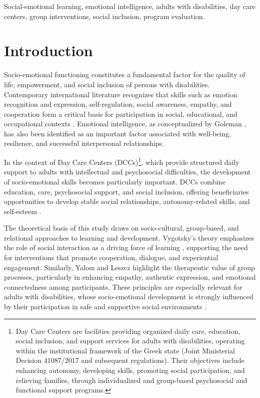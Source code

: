 \documentclass[journal]{IEEEtran}
\begin{document}
\begin{IEEEkeywords}
Social-emotional learning, emotional intelligence, adults with disabilities, day care centers, group interventions, social inclusion, program evaluation.
\end{IEEEkeywords}

\section{Introduction}

Socio-emotional functioning constitutes a fundamental factor for the quality of life, empowerment, and social inclusion of persons with disabilities. Contemporary international literature recognizes that skills such as emotion recognition and expression, self-regulation, social awareness, empathy, and cooperation form a critical basis for participation in social, educational, and occupational contexts \cite{casel2020,weissberg2015}. Emotional intelligence, as conceptualized by Goleman \cite{goleman1995}, has also been identified as an important factor associated with well-being, resilience, and successful interpersonal relationships.

In the context of Day Care Centers (DCCs)\footnote{Day Care Centers are facilities providing organized daily care, education, social inclusion, and support services for adults with disabilities, operating within the institutional framework of the Greek state (Joint Ministerial Decision 41087/2017 and subsequent regulations). Their objectives include enhancing autonomy, developing skills, promoting social participation, and relieving families, through individualized and group-based psychosocial and functional support programs.}, which provide structured daily support to adults with intellectual and psychosocial difficulties, the development of socio-emotional skills becomes particularly important. DCCs combine education, care, psychosocial support, and social inclusion, offering beneficiaries opportunities to develop stable social relationships, autonomy-related skills, and self-esteem \cite{simonsen2020}.

The theoretical basis of this study draws on socio-cultural, group-based, and relational approaches to learning and development. Vygotsky's theory emphasizes the role of social interaction as a driving force of learning \cite{vygotsky1978}, supporting the need for interventions that promote cooperation, dialogue, and experiential engagement. Similarly, Yalom and Leszcz \cite{yalom2005} highlight the therapeutic value of group processes, particularly in enhancing empathy, authentic expression, and emotional connectedness among participants. These principles are especially relevant for adults with disabilities, whose socio-emotional development is strongly influenced by their participation in safe and supportive social environments \cite{shogren2017}.
\end{document}
